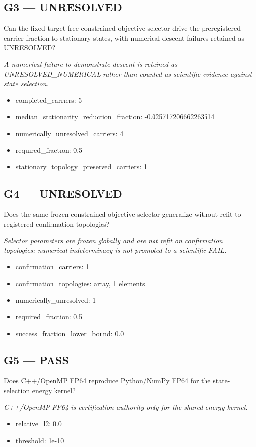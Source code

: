 \documentclass[10pt,a4paper]{article}
\begin{document}
\subsection*{G3 --- UNRESOLVED}
Can the fixed target-free constrained-objective selector drive the preregistered carrier fraction to stationary states, with numerical descent failures retained as UNRESOLVED?
\par\textit{A numerical failure to demonstrate descent is retained as UNRESOLVED\_NUMERICAL rather than counted as scientific evidence against state selection.}\par
\begin{itemize}
\item completed\_carriers: 5
\item median\_stationarity\_reduction\_fraction: -0.025717206662263514
\item numerically\_unresolved\_carriers: 4
\item required\_fraction: 0.5
\item stationary\_topology\_preserved\_carriers: 1
\end{itemize}
\subsection*{G4 --- UNRESOLVED}
Does the same frozen constrained-objective selector generalize without refit to registered confirmation topologies?
\par\textit{Selector parameters are frozen globally and are not refit on confirmation topologies; numerical indeterminacy is not promoted to a scientific FAIL.}\par
\begin{itemize}
\item confirmation\_carriers: 1
\item confirmation\_topologies: array, 1 elements
\item numerically\_unresolved: 1
\item required\_fraction: 0.5
\item success\_fraction\_lower\_bound: 0.0
\end{itemize}
\subsection*{G5 --- PASS}
Does C++/OpenMP FP64 reproduce Python/NumPy FP64 for the state-selection energy kernel?
\par\textit{C++/OpenMP FP64 is certification authority only for the shared energy kernel.}\par
\begin{itemize}
\item relative\_l2: 0.0
\item threshold: 1e-10
\end{itemize}
\end{document}
